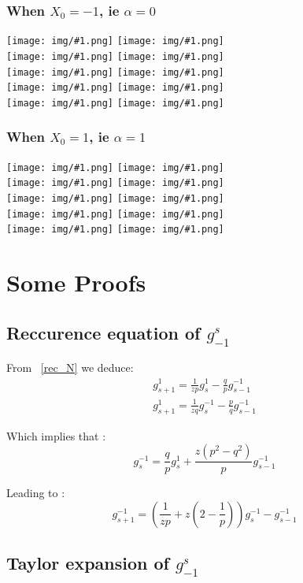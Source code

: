 \documentclass{article}
\newcommand{\g}[2]{g_{#1}^{#2}}
\newcommand{\IMG}[1] { \texttt{[image: img/\#1.png]} }
\begin{document}
\subsubsection*{When $X_0 = -1$, ie $\alpha=0$}
\IMG{0}
\IMG{1} \\
\IMG{2}
\IMG{3} \\
\IMG{4}
\IMG{5} \\
\IMG{6}
\IMG{7} \\
\IMG{8}
\IMG{9} \\

\newpage

\subsubsection*{When $X_0 = 1$, ie $\alpha=1$}
\IMG{10}
\IMG{11} \\
\IMG{12}
\IMG{13} \\
\IMG{14}
\IMG{15} \\
\IMG{16}
\IMG{17} \\
\IMG{18}
\IMG{19} \\
\appendix
\section{ Some Proofs }
\subsection{ Reccurence equation of $\g{-1}{s}$ }
From ~\ref{rec_N}  we deduce:
\begin{align*}
		\g{s+1}{1} = \frac{1}{z p} \g{s}{1} - \frac{q}{p} \g{s-1}{-1} \\
		\g{s+1}{1} = \frac{1}{ zq} \g{s}{-1} - \frac{p}{q} \g{s-1}{-1}
\end{align*}

Which implies that :
\begin{equation*}
		\g{s}{-1} =\frac{q}{p} \g{s}{1}+\frac{z (p^{2}-q^{2})}{p} \g{s-1}{-1}
\end{equation*}

Leading to :
\begin{equation*}
		\g{s+1}{-1} =  (\frac{1}{z p}   + z(2 - \frac{1}{p})) \g{s}{-1}  -  \g{s-1}{-1} 
\end{equation*}


\subsection{Taylor expansion of $\g{-1}{s}$}
\end{document}
